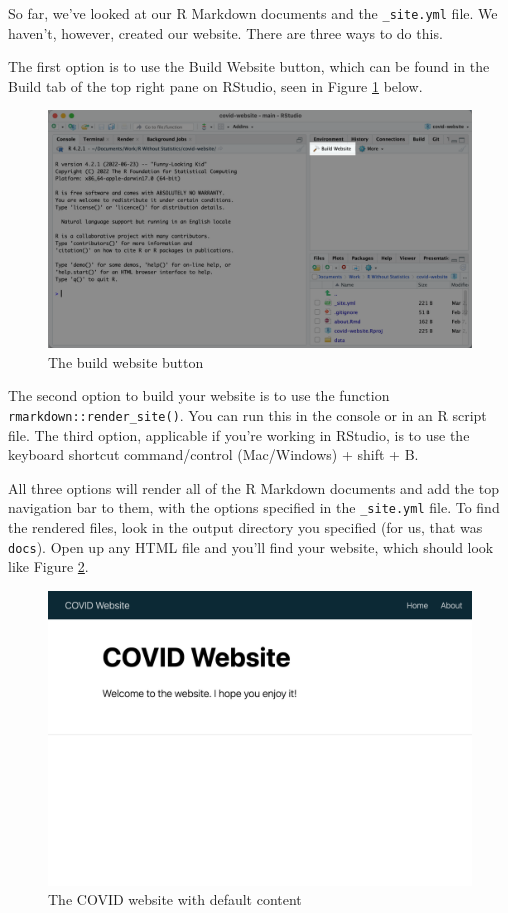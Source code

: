 \documentclass[
]{book}
\begin{document}
So far, we've looked at our R Markdown documents and the \texttt{\_site.yml} file. We haven't, however, created our website. There are three ways to do this.

The first option is to use the Build Website button, which can be found in the Build tab of the top right pane on RStudio, seen in Figure \ref{fig:build-website} below.

\begin{figure}
\includegraphics[width=1\linewidth]{assets/build-website} \caption{The build website button}\label{fig:build-website}
\end{figure}

The second option to build your website is to use the function \texttt{rmarkdown::render\_site()}. You can run this in the console or in an R script file. The third option, applicable if you're working in RStudio, is to use the keyboard shortcut command/control (Mac/Windows) + shift + B.

All three options will render all of the R Markdown documents and add the top navigation bar to them, with the options specified in the \texttt{\_site.yml} file. To find the rendered files, look in the output directory you specified (for us, that was \texttt{docs}). Open up any HTML file and you'll find your website, which should look like Figure \ref{fig:covid-website-default-content}.

\begin{figure}
\includegraphics[width=1\linewidth]{assets/covid-website-default-content} \caption{The COVID website with default content}\label{fig:covid-website-default-content}
\end{figure}
\end{document}
